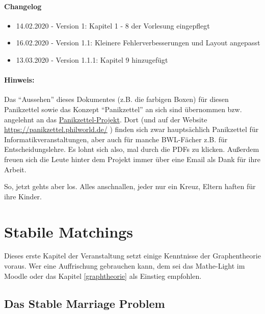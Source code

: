 \documentclass{panikzettel}
\begin{document}
\paragraph{Changelog}
\begin{itemize}
	\item 14.02.2020 - Version 1: Kapitel 1 - 8 der Vorlesung eingepflegt
	\item 16.02.2020 - Version 1.1: Kleinere Fehlerverbesserungen und Layout angepasst
	\item 13.03.2020 - Version 1.1.1: Kapitel 9 hinzugefügt
\end{itemize}


{\footnotesize{}
	\paragraph{Hinweis:}
	Das ``Aussehen'' dieses Dokumentes (z.B. die farbigen Boxen) für diesen Panikzettel sowie das Konzept ``Panikzettel'' an sich sind übernommen bzw. angelehnt an das \href{https://git.rwth-aachen.de/philipp.schroer/panikzettel}{Panikzettel-Projekt}. Dort (und auf der Website \url{https://panikzettel.philworld.de/} ) finden sich zwar hauptsächlich Panikzettel für Informatikveranstaltungen, aber auch für manche BWL-Fächer z.B. für Entscheidungslehre. Es lohnt sich also, mal durch die PDFs zu klicken. Außerdem freuen sich die Leute hinter dem Projekt immer über eine Email als Dank für ihre Arbeit.}

So, jetzt gehts aber los. Alles anschnallen, jeder nur ein Kreuz, Eltern haften für ihre Kinder.

\newpage
\section{Stabile Matchings}

Dieses erste Kapitel der Veranstaltung setzt einige Kenntnisse der Graphentheorie voraus. Wer eine Auffrischung gebrauchen kann, dem sei das Mathe-Light im Moodle oder das Kapitel \ref{graphtheorie} als Einstieg empfohlen.

\subsection{Das Stable Marriage Problem}
\end{document}
